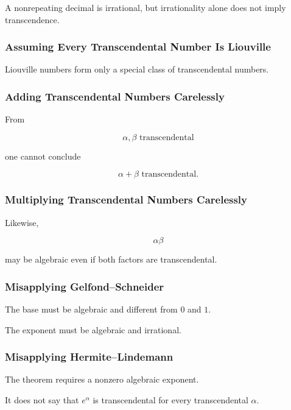 A nonrepeating decimal is irrational, but irrationality alone does not imply
transcendence.

\subsubsection{Assuming Every Transcendental Number Is Liouville}

Liouville numbers form only a special class of transcendental numbers.

\subsubsection{Adding Transcendental Numbers Carelessly}

From

\[ \alpha,\beta\text{ transcendental} \]

one cannot conclude

\[ \alpha+\beta\text{ transcendental}. \]

\subsubsection{Multiplying Transcendental Numbers Carelessly}

Likewise,

\[ \alpha\beta \]

may be algebraic even if both factors are transcendental.

\subsubsection{Misapplying Gelfond--Schneider}

The base must be algebraic and different from \(0\) and \(1\).

The exponent must be algebraic and irrational.

\subsubsection{Misapplying Hermite--Lindemann}

The theorem requires a nonzero algebraic exponent.

It does not say that \(e^\alpha\) is transcendental for every transcendental
\(\alpha\).

